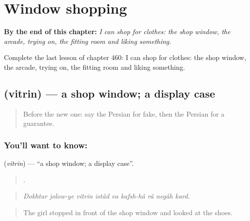 
\chapter{Window shopping}
\label{ch:fa-window-shopping}

\begin{chapteropening}
\textbf{By the end of this chapter:} \emph{I can shop for clothes: the shop window, the arcade, trying on, the fitting room and liking something.}

Complete the last lesson of chapter 460: I can shop for clothes: the shop window, the arcade, trying on, the fitting room and liking something.
\end{chapteropening}

\section[\texorpdfstring{\fa{ویترین} (vitrin)}{ویترین (vitrin)}]{ (vitrin) — a shop window; a display case}

\label{lesson:FA-C460-vitrin}



\begin{quote}
Before the new one: say the Persian for fake, then the Persian for a guarantee.
\end{quote}

\subsection*{You'll want to know: }
\textbf{} (\emph{vitrin}) — \textquotedblleft{}a shop window; a display case\textquotedblright{}.

\begin{quote}
        .
\end{quote}

\begin{quote}
\emph{Dokhtar jolow-ye vitrin istâd va kafsh-hâ râ negâh kard.}
\end{quote}

\begin{quote}
The girl stopped in front of the shop window and looked at the shoes.
\end{quote}

